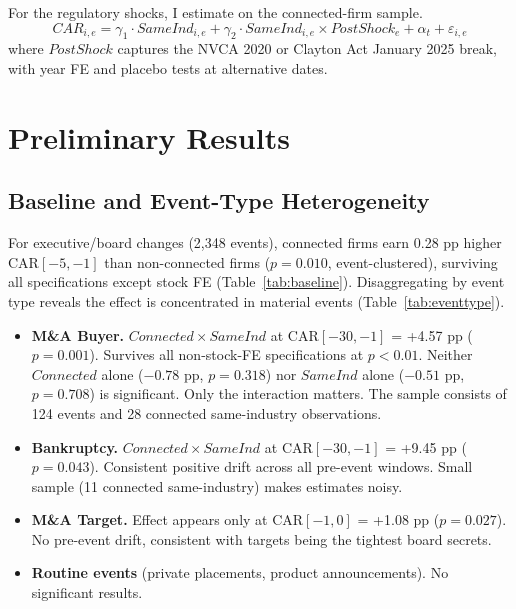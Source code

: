 \documentclass[12pt]{article}
\begin{document}
For the regulatory shocks, I estimate on the connected-firm sample.
\begin{equation}
\label{eq:nvca}
CAR_{i,e} = \gamma_1 \cdot SameInd_{i,e} + \gamma_2 \cdot SameInd_{i,e} \times PostShock_e + \alpha_t + \varepsilon_{i,e}
\end{equation}
where $PostShock$ captures the NVCA 2020 or Clayton Act January 2025 break, with year FE and placebo tests at alternative dates.



\section{Preliminary Results}
\label{sec:results}

\subsection{Baseline and Event-Type Heterogeneity}



For executive/board changes (2,348 events), connected firms earn 0.28 pp higher CAR$[-5,-1]$ than non-connected firms ($p=0.010$, event-clustered), surviving all specifications except stock FE (Table~\ref{tab:baseline}). Disaggregating by event type reveals the effect is concentrated in material events (Table~\ref{tab:eventtype}).

\begin{itemize}
\item \textbf{M\&A Buyer.} $Connected \times SameInd$ at CAR$[-30,-1]$ = +4.57 pp ($p=0.001$). Survives all non-stock-FE specifications at $p<0.01$. Neither $Connected$ alone ($-0.78$ pp, $p=0.318$) nor $SameInd$ alone ($-0.51$ pp, $p=0.708$) is significant. Only the interaction matters. The sample consists of 124 events and 28 connected same-industry observations.
\item \textbf{Bankruptcy.} $Connected \times SameInd$ at CAR$[-30,-1]$ = +9.45 pp ($p=0.043$). Consistent positive drift across all pre-event windows. Small sample (11 connected same-industry) makes estimates noisy.
\item \textbf{M\&A Target.} Effect appears only at CAR$[-1,0]$ = +1.08 pp ($p=0.027$). No pre-event drift, consistent with targets being the tightest board secrets.
\item \textbf{Routine events} (private placements, product announcements). No significant results.
\end{itemize}
\end{document}
